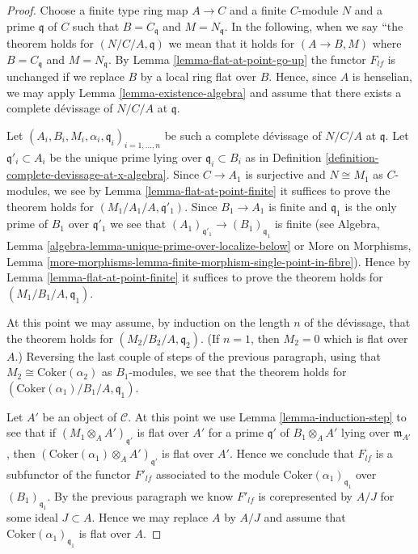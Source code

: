 \begin{proof}
Choose a finite type ring map $A \to C$ and a finite $C$-module $N$
and a prime $\mathfrak q$ of $C$ such that $B = C_{\mathfrak q}$
and $M = N_{\mathfrak q}$. In the following, when we say
``the theorem holds for $(N/C/A, \mathfrak q)$ we mean that
it holds for $(A \to B, M)$ where $B = C_{\mathfrak q}$ and
$M = N_{\mathfrak q}$. By
Lemma \ref{lemma-flat-at-point-go-up}
the functor $F_{lf}$ is unchanged if we replace $B$ by a local ring
flat over $B$. Hence, since $A$ is henselian, we may apply
Lemma \ref{lemma-existence-algebra}
and assume that there exists a complete d\'evissage of
$N/C/A$ at $\mathfrak q$.

\medskip\noindent
Let $(A_i, B_i, M_i, \alpha_i, \mathfrak q_i)_{i = 1, \ldots, n}$
be such a complete d\'evissage of $N/C/A$ at $\mathfrak q$. Let
$\mathfrak q'_i \subset A_i$ be the unique prime lying over
$\mathfrak q_i \subset B_i$ as in
Definition \ref{definition-complete-devissage-at-x-algebra}.
Since $C \to A_1$ is surjective and $N \cong M_1$ as $C$-modules,
we see by
Lemma \ref{lemma-flat-at-point-finite}
it suffices to prove the theorem holds for $(M_1/A_1/A, \mathfrak q'_1)$.
Since $B_1 \to A_1$ is finite and $\mathfrak q_1$ is the only prime
of $B_1$ over $\mathfrak q'_1$ we see that
$(A_1)_{\mathfrak q'_1} \to (B_1)_{\mathfrak q_1}$ is finite (see
Algebra, Lemma \ref{algebra-lemma-unique-prime-over-localize-below} or
More on Morphisms,
Lemma \ref{more-morphisms-lemma-finite-morphism-single-point-in-fibre}).
Hence by
Lemma \ref{lemma-flat-at-point-finite}
it suffices to prove the theorem holds for $(M_1/B_1/A, \mathfrak q_1)$.

\medskip\noindent
At this point we may assume, by induction on the length $n$ of the
d\'evissage, that the theorem holds for $(M_2/B_2/A, \mathfrak q_2)$.
(If $n = 1$, then $M_2 = 0$ which is flat over $A$.)
Reversing the last couple of steps of the previous paragraph, using
that $M_2 \cong \text{Coker}(\alpha_2)$ as $B_1$-modules, we see
that the theorem holds for $(\text{Coker}(\alpha_1)/B_1/A, \mathfrak q_1)$.

\medskip\noindent
Let $A'$ be an object of $\mathcal{C}$. At this point we use
Lemma \ref{lemma-induction-step}
to see that if $(M_1 \otimes_A A')_{\mathfrak q'}$ is flat
over $A'$ for a prime $\mathfrak q'$ of $B_1 \otimes_A A'$
lying over $\mathfrak m_{A'}$, then
$(\text{Coker}(\alpha_1) \otimes_A A')_{\mathfrak q'}$ is flat over $A'$.
Hence we conclude that $F_{lf}$ is a subfunctor of the
functor $F'_{lf}$ associated to the module
$\text{Coker}(\alpha_1)_{\mathfrak q_1}$ over $(B_1)_{\mathfrak q_1}$.
By the previous paragraph we know $F'_{lf}$ is corepresented by
$A/J$ for some ideal $J \subset A$. Hence we may replace $A$ by
$A/J$ and assume that $\text{Coker}(\alpha_1)_{\mathfrak q_1}$ is
flat over $A$.


\end{proof}
